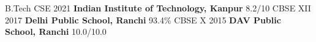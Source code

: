 
\newcommand{\education}[4]{
  & #1 & #2 & &#3 & #4
}
  
  \cventry
  { }
  {\newline B.Tech CSE \hspace{0.5cm} 2021 \hspace{1cm} \textbf{Indian Institute of Technology, Kanpur} \hspace{0.2cm} 8.2/10   \newline
   CBSE XII \hspace{0.8cm} 2017 \hspace{1cm} \textbf{Delhi Public School, Ranchi}   \hspace{2.2cm}   93.4\%            \newline
   CBSE X \hspace{1.13cm} 2015 \hspace{1cm}  \textbf{DAV Public School, Ranchi} \hspace{2cm}  10.0/10.0    }
  {}
  {}
  {
  }
